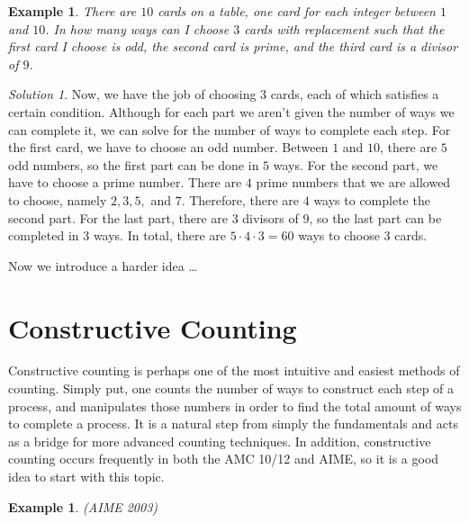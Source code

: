 \documentclass[letterpaper]{article}
\newtheorem{example}[thm]{Example}
\theoremstyle{remark}
\newtheorem*{solution}{Solution}
\begin{document}
\begin{example}

There are $10$ cards on a table, one card for each integer between $1$ and $10$. In how many ways can I choose $3$ cards with replacement such that the first card I choose is odd, the second card is prime, and the third card is a divisor of $9$.
\end{example}

\begin{solution}

Now, we have the job of choosing $3$ cards, each of which satisfies a certain condition. Although for each part we aren't given the number of ways we can complete it, we can solve for the number of ways to complete each step. For the first card, we have to choose an odd number. Between $1$ and $10$, there are $5$ odd numbers, so the first part can be done in $5$ ways. For the second part, we have to choose a prime number. There are $4$ prime numbers that we are allowed to choose, namely $2, 3, 5, $ and $7$. Therefore, there are $4$ ways to complete the second part. For the last part, there are $3$ divisors of $9$, so the last part can be completed in $3$ ways. In total, there are $5\cdot 4 \cdot 3=60$ ways to choose $3$ cards.
\end{solution}

Now we introduce a harder idea \dots



\section{Constructive Counting}

Constructive counting is perhaps one of the most intuitive and easiest methods of counting. Simply put, one counts the number of ways to construct each step of a process, and manipulates those numbers in order to find the total amount of ways to complete a process. It is a natural step from simply the fundamentals and acts as a bridge for more advanced counting techniques. In addition, constructive counting occurs frequently in both the AMC 10/12 and AIME, so it is a good idea to start with this topic.

\begin{example}
(AIME 2003)

\end{example}
\end{document}
